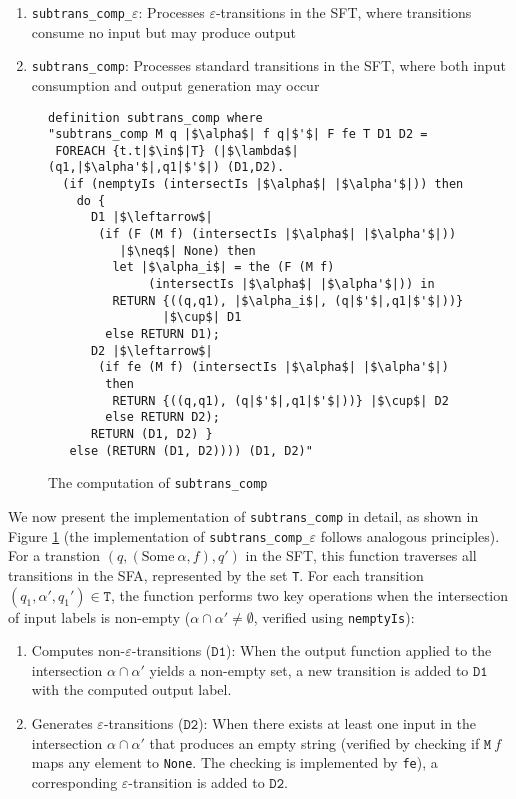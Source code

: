 \documentclass[sigplan,10pt,anonymous,review]{acmart}\settopmatter{printfolios=true,printccs=false,printacmref=false}
\begin{document}
\begin{enumerate}
  \item \texttt{subtrans\_comp\_$\varepsilon$}: Processes $\varepsilon$-transitions in the SFT, where transitions consume no input but may produce output
  \item \texttt{subtrans\_comp}: Processes standard transitions in the SFT, where both input consumption and output generation may occur
\end{enumerate}




\begin{figure}[hbt!]
\begin{lstlisting}[language=SMTLIB]
definition subtrans_comp where
"subtrans_comp M q |$\alpha$| f q|$'$| F fe T D1 D2 =
 FOREACH {t.t|$\in$|T} (|$\lambda$| (q1,|$\alpha'$|,q1|$'$|) (D1,D2).
  (if (nemptyIs (intersectIs |$\alpha$| |$\alpha'$|)) then
    do {
      D1 |$\leftarrow$| 
       (if (F (M f) (intersectIs |$\alpha$| |$\alpha'$|)) 
          |$\neq$| None) then
         let |$\alpha_i$| = the (F (M f) 
              (intersectIs |$\alpha$| |$\alpha'$|)) in
         RETURN {((q,q1), |$\alpha_i$|, (q|$'$|,q1|$'$|))} 
                |$\cup$| D1
        else RETURN D1);
      D2 |$\leftarrow$| 
       (if fe (M f) (intersectIs |$\alpha$| |$\alpha'$|) 
        then 
         RETURN {((q,q1), (q|$'$|,q1|$'$|))} |$\cup$| D2 
        else RETURN D2);
      RETURN (D1, D2) }
   else (RETURN (D1, D2)))) (D1, D2)"
    \end{lstlisting}
    \caption{The computation of \texttt{subtrans\_comp}}
    \label{fig-def-subtrans_comp}
    \end{figure}


    We now present the implementation of \texttt{subtrans\_comp} in detail, as shown in Figure \ref{fig-def-subtrans_comp} (the implementation of \texttt{subtrans\_comp\_$\varepsilon$} follows analogous principles). For a transtion $(q, (\text{Some}~\alpha, f), q')$ in the SFT, this function traverses all transitions in the SFA, represented by the set \texttt{T}. For each transition $(q_1, \alpha', q_1')\in \texttt{T}$, the function performs two key operations when the intersection of input labels is non-empty ($\alpha \cap \alpha' \neq \emptyset$, verified using \texttt{nemptyIs}):

    \begin{enumerate}
      \item Computes non-$\varepsilon$-transitions ($\texttt{D1}$): When the output function applied to the intersection $\alpha \cap \alpha'$ yields a non-empty set, a new transition is added to $\texttt{D1}$ with the computed output label.
      \item Generates $\varepsilon$-transitions ($\texttt{D2}$): When there exists at least one input in the intersection $\alpha \cap \alpha'$ that produces an empty string (verified by checking if $\texttt{M}~f$ maps any element to \texttt{None}. The checking is implemented by \texttt{fe}), a corresponding $\varepsilon$-transition is added to $\texttt{D2}$.
    \end{enumerate}
    
\end{document}
